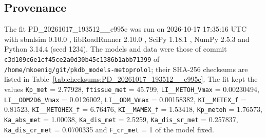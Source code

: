 \documentclass{article}
\begin{document}
\subsection{Provenance}

The fit PD\_20261017\_193512\_\_e995e was run on 2026-10-17 17:35:16 UTC with sbmlsim 0.10.0 \cite{Koenig2026_sbmlsim}, libRoadRunner 2.10.0 \cite{Welsh2023}, SciPy 1.18.1 \cite{Virtanen2020}, NumPy 2.5.3 \cite{Harris2020} and Python 3.14.4 (seed 1234). The models and data were those of commit \texttt{c3d109c6e1cf45ce2a0d30b45c1386b1abb71399} of \texttt{/home/mkoenig/git/pkdb\_models-metoprolol}; their SHA-256 checksums are listed in Table~\ref{tab:checksums:PD_20261017_193512__e995e}. The fit kept the values \texttt{Kp\_met} = 2.77928, \texttt{ftissue\_met} = 45.799, \texttt{LI\_\_METOH\_Vmax} = 0.00230494, \texttt{LI\_\_ODM2D6\_Vmax} = 0.0126002, \texttt{LI\_\_ODM\_Vmax} = 0.00158382, \texttt{KI\_\_METEX\_f} = 0.81523, \texttt{KI\_\_METOHEX\_f} = 6.76476, \texttt{KI\_\_MAMEX\_f} = 1.53418, \texttt{Kp\_metoh} = 1.76573, \texttt{Ka\_abs\_met} = 1.00038, \texttt{Ka\_dis\_met} = 2.5259, \texttt{Ka\_dis\_sr\_met} = 0.257837, \texttt{Ka\_dis\_cr\_met} = 0.0700335 and \texttt{F\_cr\_met} = 1 of the model fixed.
\end{document}
